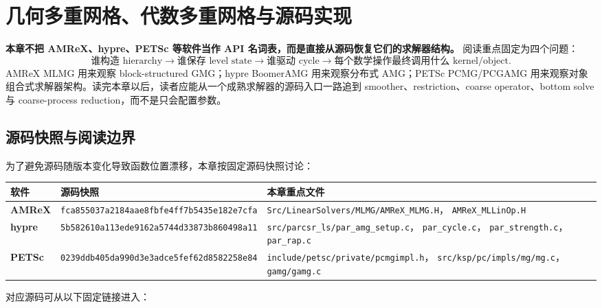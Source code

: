 \chapter{几何多重网格、代数多重网格与源码实现}
\label{ch:software}

\begin{keybox}
\textbf{本章不把 AMReX、hypre、PETSc 等软件当作 API 名词表，而是直接从源码恢复它们的求解器结构。}
阅读重点固定为四个问题：
\begin{equation}
\boxed{
\text{谁构造 hierarchy}
\rightarrow
\text{谁保存 level state}
\rightarrow
\text{谁驱动 cycle}
\rightarrow
\text{每个数学操作最终调用什么 kernel/object}.
}
\label{eq:software-source-reading-chain}
\end{equation}
AMReX MLMG 用来观察 block-structured GMG；hypre BoomerAMG 用来观察分布式 AMG；PETSc PCMG/PCGAMG 用来观察对象组合式求解器架构。读完本章以后，读者应能从一个成熟求解器的源码入口一路追到 smoother、restriction、coarse operator、bottom solve 与 coarse-process reduction，而不是只会配置参数。
\end{keybox}

\section{源码快照与阅读边界}

为了避免源码随版本变化导致函数位置漂移，本章按固定源码快照讨论：

\begin{center}
\small
\begin{tabularx}{0.98\textwidth}{>{\bfseries}p{2.0cm}p{3.1cm}X}
\toprule
软件 & 源码快照 & 本章重点文件\\
\midrule
AMReX &
\texttt{fca855037a2184aae8fbfe4ff7b5435e182e7cfa} &
\texttt{Src/LinearSolvers/MLMG/AMReX\_MLMG.H}，
\texttt{AMReX\_MLLinOp.H}\\
hypre &
\texttt{5b582610a113ede9162a5744d33873b860498a11} &
\texttt{src/parcsr\_ls/par\_amg\_setup.c}，
\texttt{par\_cycle.c}，
\texttt{par\_strength.c}，
\texttt{par\_rap.c}\\
PETSc &
\texttt{0239ddb405da990d3e3adce5fef62d8582258e84} &
\texttt{include/petsc/private/pcmgimpl.h}，
\texttt{src/ksp/pc/impls/mg/mg.c}，
\texttt{gamg/gamg.c}\\
\bottomrule
\end{tabularx}
\end{center}

对应源码可从以下固定链接进入：

